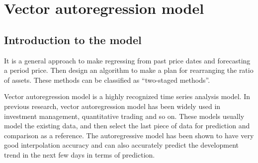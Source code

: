 \documentclass{mcmthesis}
\begin{document}






\section{Vector autoregression model}

\subsection{Introduction to the model}
It is a general approach to make regressing from past price dates and forecasting a period price. Then design an algorithm to make a plan for rearranging the ratio of assets. These methods can be classified as ``two-staged methods''.

Vector autoregression model is a highly recognized time series analysis model. In previous research, vector autoregression model has been widely used in investment management, quantitative trading and so on. These models usually model the existing data, and then select the last piece of data for prediction and comparison as a reference. The autoregressive model has been shown to have very good interpolation accuracy and can also accurately predict the development trend in the next few days in terms of prediction.
\end{document}
